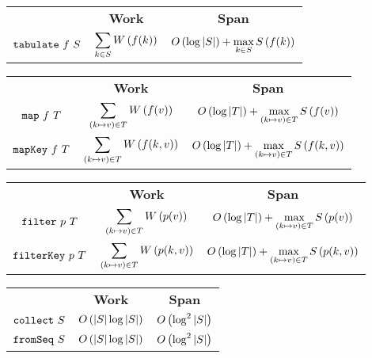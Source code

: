 \begin{costspec}[Tabulate]
\begin{tabular}{c|c|c}
& \textbf{Work} & \textbf{Span} \\
$\texttt{tabulate}~f~S$ &
$\displaystyle\sum_{k \in S} W\left({f(k)}\right)$ &
$O\left({\log|S|}\right) + \displaystyle\max_{k \in S} S\left({f(k)}\right)$
\end{tabular}
\end{costspec}

\begin{costspec}[Map]
\begin{tabular}{c|c|c}
& \textbf{Work} & \textbf{Span} \\
$\texttt{map}~f~T$ &
$\displaystyle\sum_{(k \mapsto v) \in T} W\left({f(v)}\right)$ &
$O\left({\log|T|}\right) + \displaystyle\max_{(k \mapsto v) \in T} S\left({f(v)}\right)$
\\
$\texttt{mapKey}~f~T$ &
$\displaystyle\sum_{(k \mapsto v) \in T} W\left({f(k,v)}\right)$ &
$O\left({\log|T|}\right) + \displaystyle\max_{(k \mapsto v) \in T} S\left({f(k,v)}\right)$
\end{tabular}
\end{costspec}

\begin{costspec}[Filter]
\begin{tabular}{c|c|c}
& \textbf{Work} & \textbf{Span} \\
$\texttt{filter}~p~T$ &
$\displaystyle\sum_{(k \mapsto v) \in T} W\left({p(v)}\right)$ &
$O\left({\log|T|}\right) + \displaystyle\max_{(k \mapsto v) \in T} S\left({p(v)}\right)$
\\
$\texttt{filterKey}~p~T$ &
$\displaystyle\sum_{(k \mapsto v) \in T} W\left({p(k,v)}\right)$ &
$O\left({\log|T|}\right) + \displaystyle\max_{(k \mapsto v) \in T} S\left({p(k,v)}\right)$
\end{tabular}
\end{costspec}

\begin{costspec}
\begin{tabular}{c|c|c}
& \textbf{Work} & \textbf{Span} \\
$\texttt{collect}~S$ & $O\left({|S|\log|S|}\right)$ & $O\left({\log^2|S|}\right)$ \\
$\texttt{fromSeq}~S$ & $O\left({|S|\log|S|}\right)$ & $O\left({\log^2|S|}\right)$
\end{tabular}
\end{costspec}

